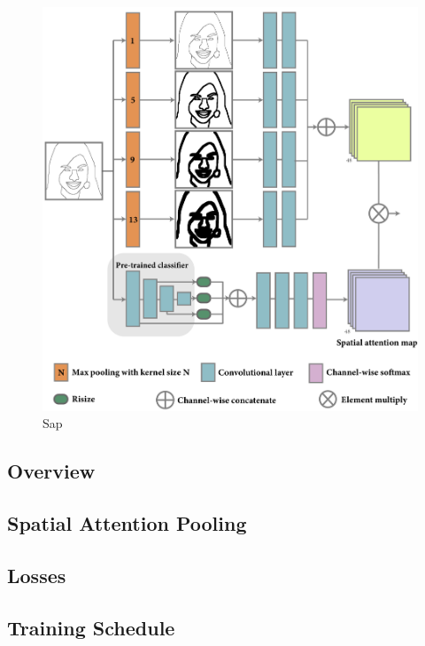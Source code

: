 \begin{figure}
	\includegraphics[width=\columnwidth]{figs/sap}
	\caption{Sap}
	\label{fig:sap}
\end{figure}
%
\subsection{Overview}


\subsection{Spatial Attention Pooling}
\label{subsec:algorithm_sap}




\subsection{Losses}
\label{subsec:algorithm_loss}


\subsection{Training Schedule}
\label{subsec:algorithm_training}

